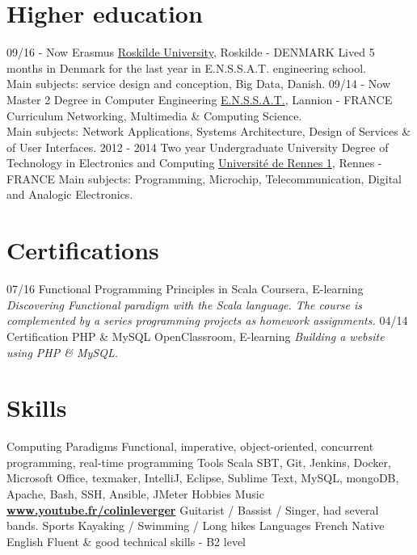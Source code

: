 \documentclass[]{friggeri-cv}
\begin{document}
\section{Higher education}
\begin{entrylist}
  \entry
    {09/16 - Now}
    {Erasmus}
    {\href{http://www.ruc.dk/en/}{Roskilde University}, Roskilde - DENMARK}
    {Lived 5 months in Denmark for the last year in E.N.S.S.A.T. engineering school.\\ 
    Main subjects: service design and conception, Big Data, Danish.}
  \entry
    {09/14 - Now}
    {Master 2 Degree in Computer Engineering}
    {\href{http://www.enssat.fr}{E.N.S.S.A.T.}, Lannion - FRANCE}
    {Curriculum Networking, Multimedia \& Computing Science.\\
    Main subjects: Network Applications, Systems Architecture, Design of Services \& of User Interfaces.}
  \entry
    {2012 - 2014}
    {Two year Undergraduate University Degree of Technology in Electronics and Computing}
    {\href{https://iut-rennes.univ-rennes1.fr/les-6-departements/genie-electrique-informatique-industrielle}{Universit\'e de Rennes 1}, Rennes - FRANCE}
    {Main subjects: Programming, Microchip, Telecommunication, Digital and Analogic Electronics.}
\end{entrylist}

\section{Certifications}
\begin{entrylist}
  \entry
    {07/16}
    {Functional Programming Principles in Scala}
    {Coursera, E-learning}
    {\emph{Discovering Functional paradigm with the Scala language. The course is complemented by a series programming projects as homework assignments.}}
  \entry
    {04/14}
    {Certification PHP \& MySQL}
    {OpenClassroom, E-learning}
    {\emph{Building a website using PHP \& MySQL.}} 
\end{entrylist}

\section{Skills}
\begin{entrylist}
  \entry
    {Computing}
    {Paradigms}
    {}
    {Functional, imperative, object-oriented, concurrent programming, real-time programming}
  \entry
    {}
    {Tools}
    {}
    {Scala SBT, Git, Jenkins, Docker, Microsoft Office, texmaker, IntelliJ, Eclipse, Sublime Text, MySQL, mongoDB, Apache, Bash, SSH, Ansible, JMeter}
  \entry
    {Hobbies}
    {Music}
    {\href{https://www.youtube.com/channel/UCPBCzj-0apmax9lFwj3qKhA}{\textbf{www.youtube.fr/colinleverger}}}
    {Guitarist / Bassist / Singer, had several bands.}
  \entry
    {}
    {Sports}
    {}
    {Kayaking / Swimming / Long hikes}
  \entry
    {Languages}
    {French}
    {}
    {Native}
  \entry
    {}
    {English}
    {}
    {Fluent \& good technical skills - B2 level}
\end{entrylist}
\end{document}
